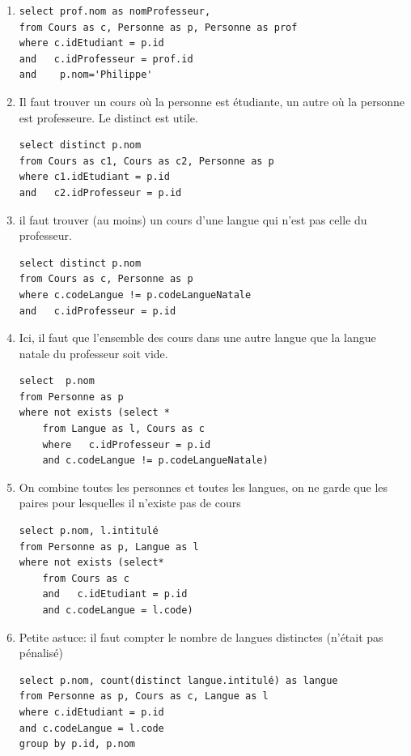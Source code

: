 \begin{solution}
\begin{enumerate}
  \item
\begin{verbatim}
select prof.nom as nomProfesseur, 
from Cours as c, Personne as p, Personne as prof
where c.idEtudiant = p.id
and   c.idProfesseur = prof.id
and    p.nom='Philippe'
\end{verbatim}

 \item Il faut trouver un cours où la personne est étudiante, un autre
   où la personne est professeure. Le distinct est utile.
\begin{verbatim}
select distinct p.nom 
from Cours as c1, Cours as c2, Personne as p
where c1.idEtudiant = p.id
and   c2.idProfesseur = p.id
\end{verbatim}


   \item il faut trouver (au moins) un cours d'une langue
       qui  n'est pas celle du professeur.
 \begin{verbatim}
select distinct p.nom 
from Cours as c, Personne as p
where c.codeLangue != p.codeLangueNatale
and   c.idProfesseur = p.id
\end{verbatim}

  \item Ici, il faut que l'ensemble des cours dans une autre langue que
    la langue natale du professeur soit vide.
    
\begin{verbatim}
select  p.nom
from Personne as p
where not exists (select *
    from Langue as l, Cours as c
    where   c.idProfesseur = p.id
    and c.codeLangue != p.codeLangueNatale)
\end{verbatim}

  \item On combine toutes les personnes et toutes les langues, 
  on ne garde que les paires pour lesquelles il n'existe pas de cours

\begin{verbatim}
select p.nom, l.intitulé
from Personne as p, Langue as l
where not exists (select*
    from Cours as c
    and   c.idEtudiant = p.id
    and c.codeLangue = l.code)
\end{verbatim}

    \item Petite astuce: il faut compter le nombre de langues distinctes
    (n'était pas pénalisé)
    
\begin{verbatim}
select p.nom, count(distinct langue.intitulé) as langue
from Personne as p, Cours as c, Langue as l
where c.idEtudiant = p.id
and c.codeLangue = l.code
group by p.id, p.nom 
\end{verbatim}
    

\end{enumerate}
\end{solution}
